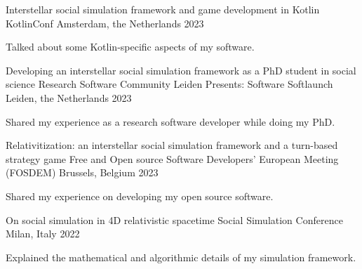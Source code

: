 

\begin{cventries}

  \cventry
    {Interstellar social simulation framework and game development in Kotlin} %
    {KotlinConf} %
    {Amsterdam, the Netherlands} %
    {2023} %
    {
      \begin{cvitems} %
        \item {Talked about some Kotlin-specific aspects of my software.}
      \end{cvitems}
    }

  \cventry
    {Developing an interstellar social simulation framework as a PhD student in social science} %
    {Research Software Community Leiden Presents: Software Softlaunch} %
    {Leiden, the Netherlands} %
    {2023} %
    {
      \begin{cvitems} %
        \item {Shared my experience as a research software developer while doing my PhD.}
      \end{cvitems}
    }

  \cventry
    {Relativitization: an interstellar social simulation framework and a turn-based strategy game} %
    {Free and Open source Software Developers' European Meeting (FOSDEM)} %
    {Brussels, Belgium} %
    {2023} %
    {
      \begin{cvitems} %
        \item {Shared my experience on developing my open source software.}
      \end{cvitems}
    }

  \cventry
    {On social simulation in 4D relativistic spacetime} %
    {Social Simulation Conference} %
    {Milan, Italy} %
    {2022} %
    {
      \begin{cvitems} %
        \item {Explained the mathematical and algorithmic details of my simulation framework.}
      \end{cvitems}
    }


\end{cventries}
